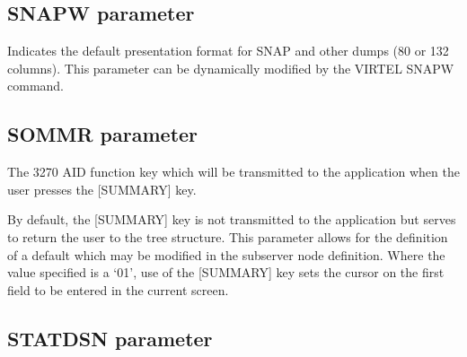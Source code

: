 \documentclass[letterpaper,10pt,english]{sphinxmanual}
\begin{document}
\ignorespaces 

\subsection{SNAPW parameter}
\label{\detokenize{Installation_Guide:snapw-parameter}}\label{\detokenize{Installation_Guide:index-116}}
\begin{sphinxVerbatim}[commandchars=\\\{\}]
 
\end{sphinxVerbatim}

\sphinxAtStartPar
Indicates the default presentation format for SNAP and other dumps (80 or 132 columns). This parameter can be dynamically modified by the VIRTEL SNAPW command.


\subsection{SOMMR parameter}
\label{\detokenize{Installation_Guide:sommr-parameter}}
\begin{sphinxVerbatim}[commandchars=\\\{\}]
 
\end{sphinxVerbatim}

\sphinxAtStartPar
{} \sphinxhyphen{} The 3270 AID function key which will be transmitted to the application when the user presses the {[}SUMMARY{]} key.

\sphinxAtStartPar
By default, the {[}SUMMARY{]} key is not transmitted to the application but serves to return the user to the tree structure. This parameter allows for the definition of a default which may be modified in the sub\sphinxhyphen{}server node definition. Where the value specified is a ‘01’, use of the {[}SUMMARY{]} key sets the cursor on the first field to be entered in the current screen.

\ignorespaces 

\subsection{STATDSN parameter}
\label{\detokenize{Installation_Guide:statdsn-parameter}}\label{\detokenize{Installation_Guide:index-117}}
\begin{sphinxVerbatim}[commandchars=\\\{\}]
 
\end{sphinxVerbatim}
\end{document}
